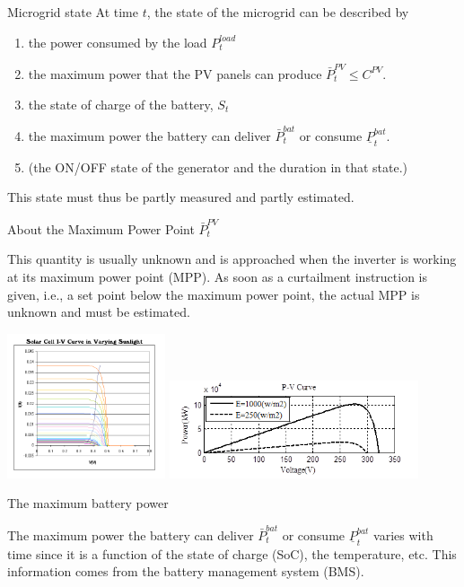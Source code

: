 \begin{frame}{Microgrid state}
At time $t$, the state of the microgrid can be described by
\begin{enumerate}
 \item the power consumed by the load $P^{load}_t$ %
 \item the maximum power that the PV panels can produce $\bar{P}^{PV}_t \leq C^{PV}$. 
 \item the state of charge of the battery, $S_t$
 \item the maximum power the battery can deliver $\bar{P}^{bat}_t$ or consume $\underline{P}^{bat}_t$. 
 \item (the ON/OFF state of the generator and the duration in that state.)
\end{enumerate}
This state must thus be partly measured and partly estimated.
\end{frame}

\begin{frame}{About the Maximum Power Point $\bar{P}^{PV}_t$}

    This quantity is usually unknown and is approached when the inverter is working at its maximum power point (MPP). As soon as a curtailment instruction is given, i.e., a set point below the maximum power point, the actual MPP is unknown and must be estimated. 

    \begin{center}    
    \includegraphics[width=0.35\textwidth]{images/Solar-Cell-IV-curve-with-MPP.png}%
    \includegraphics[width=0.55\textwidth]{images/Power-voltage_(P_-V)_curve.png}    
    \end{center}


\end{frame}
\begin{frame}{The maximum battery power}

The maximum power the battery can deliver $\bar{P}^{bat}_t$ or consume $\underline{P}^{bat}_t$ varies with time since it is a function of the state of charge (SoC), the temperature, etc. This information comes from the battery management system (BMS).
    
\end{frame}

